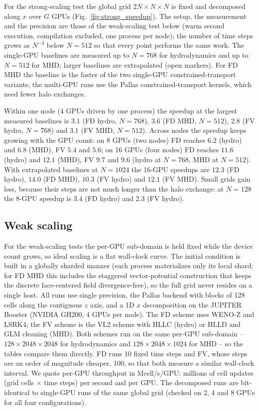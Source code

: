 For the strong-scaling test the global grid $2N\times N\times N$ is fixed
and decomposed along $x$ over $G$ GPUs (Fig.~\ref{fig:strong_speedup}).
The setup, the measurement and the precision are those of the weak-scaling
test below (warm second execution, compilation excluded, one process per
node); the number of time steps grows as $N^{-3}$ below $N=512$ so that
every point performs the same work.  The single-GPU baselines are measured
up to $N=768$ for hydrodynamics and up to $N=512$ for MHD;
larger baselines are extrapolated (open markers).  For FD MHD the baseline
is the faster of the two single-GPU constrained-transport variants; the
multi-GPU runs use the Pallas constrained-transport kernels, which need
fewer halo exchanges.

Within one node (4 GPUs driven by one process) the speedup at the largest
measured baselines is $3.1$ (FD hydro, $N=768$), $3.6$ (FD MHD,
$N=512$), $2.8$ (FV hydro, $N=768$) and $3.1$ (FV MHD, $N=512$).  Across
nodes the speedup keeps growing with the GPU count: on 8 GPUs (two
nodes) FD reaches $6.2$ (hydro) and $6.8$ (MHD), FV $5.4$ and
$5.6$; on 16 GPUs (four nodes) FD reaches $11.6$ (hydro) and
$12.1$ (MHD), FV $9.7$ and $9.6$ (hydro at $N=768$, MHD at
$N=512$).  With extrapolated baselines at $N=1024$ the 16-GPU speedups
are $12.3$ (FD hydro), $14.0$ (FD MHD), $10.3$ (FV hydro) and
$12.1$ (FV MHD).  Small grids gain less, because their steps are not
much longer than the halo exchange: at $N=128$ the 8-GPU speedup is $3.4$
(FD hydro) and $2.3$ (FV hydro).

\subsection{Weak scaling}
\label{sec:weak_scaling}

For the weak-scaling tests the per-GPU sub-domain is held fixed while the
device count grows, so ideal scaling is a flat wall-clock curve.  The
initial condition is built in a globally sharded manner (each process
materializes only its local shard; for FD MHD this includes the staggered
vector-potential construction that keeps the discrete face-centered field
divergence-free), so the full grid never resides on a single host.  All
runs use single precision, the Pallas backend with blocks of 128 cells
along the contiguous $z$ axis, and a 1D $x$ decomposition on the JUPITER
Booster (NVIDIA GH200, 4 GPUs per node).  The FD scheme uses WENO-Z and
LSRK4; the FV scheme is the VL2 scheme with HLLC (hydro) or HLLD and GLM
cleaning (MHD).  Both schemes run on the same per-GPU sub-domain --
$128\times2048\times2048$ for hydrodynamics and $128\times2048\times1024$
for MHD -- so the tables compare them directly.  FD runs 10 fixed time
steps and FV, whose steps are an order of magnitude cheaper, 100, so that
both measure a similar wall-clock interval.  We quote per-GPU throughput in
Mcell/s/GPU: millions of cell updates (grid cells $\times$ time steps) per
second and per GPU.  The decomposed runs are bit-identical to single-GPU
runs of the same global grid (checked on 2, 4 and 8 GPUs for all four
configurations).

